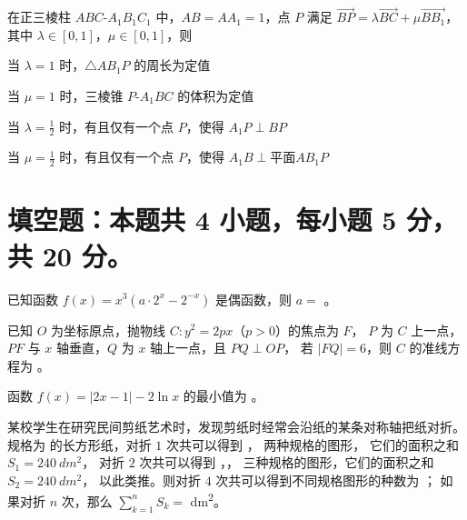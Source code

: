 \documentclass{exam-zh}
\begin{document}
\begin{question}
  在正三棱柱 $ABC$-$A_1 B_1 C_1$ 中，$AB = A A_1 = 1$，点 $P$ 满足
  $\overrightarrow{BP} = \lambda \overrightarrow{BC} + \mu \overrightarrow{BB_1}$，
  其中 $\lambda \in [0, 1]$，$\mu \in [0, 1]$，则 \paren
  \begin{choices}
    \item 当 $\lambda = 1$ 时，$\triangle A B_1 P$ 的周长为定值
    \item 当 $\mu = 1$ 时，三棱锥 $P$-$A_1 B C$ 的体积为定值
    \item 当 $\lambda = \frac{1}{2}$ 时，有且仅有一个点 $P$，使得 $A_1 P \perp BP$
    \item 当 $\mu = \frac{1}{2}$ 时，有且仅有一个点 $P$，使得 $A_1 B \perp \text{平面} A B_1 P$
  \end{choices}
\end{question}



\section{填空题：本题共 4 小题，每小题 5 分，共 20 分。}

\begin{question}
  已知函数 $f(x) = x^3 (a \cdot 2^x - 2^{-x})$ 是偶函数，则 $a = $ \fillin[$1$] 。
\end{question}

\begin{question}
  已知 $O$ 为坐标原点，抛物线 $C \colon y^2 = 2px$（$p > 0$）的焦点为 $F$，
  $P$ 为 $C$ 上一点，$PF$ 与 $x$ 轴垂直，$Q$ 为 $x$ 轴上一点，且 $PQ \perp OP$，
  若 $|FQ| = 6$，则 $C$ 的准线方程为 \fillin[$\dfrac{1}{3}$] 。
\end{question}

\begin{question}
  函数 $f(x) = |2x - 1| - 2 \ln x$ 的最小值为 \fillin[width = 4em][] 。
\end{question}

\begin{question}
  某校学生在研究民间剪纸艺术时，发现剪纸时经常会沿纸的某条对称轴把纸对折。
  规格为  的长方形纸，对折 $1$ 次共可以得到
  ，  两种规格的图形，
  它们的面积之和 $S_1 = \qty{240}{dm^2}$，
  对折 $2$ 次共可以得到 ，，
   三种规格的图形，它们的面积之和 $S_2 = \qty{240}{dm^2}$，
  以此类推。则对折 $4$ 次共可以得到不同规格图形的种数为 \fillin ；
  如果对折 $n$ 次，那么 $\sum_{k=1}^n S_k = $ \fillin \unit{dm^2}。
\end{question}
\end{document}
